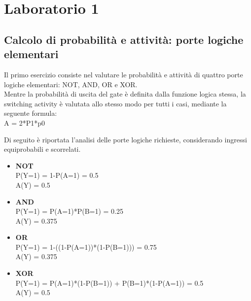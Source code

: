 

\chapter{Laboratorio 1}




\section{Calcolo di probabilit\`a e attivit\`a: porte logiche elementari}

Il primo esercizio consiste nel valutare le probabilit\`a e attività di quattro porte logiche elementari: NOT, AND, OR e XOR.
\\
Mentre la probabilità di uscita del gate è definita dalla funzione logica stessa, la switching activity è valutata allo stesso modo per tutti i casi, mediante la seguente formula: \\
A = 2*P1*p0

Di seguito è riportata l'analisi delle porte logiche richieste, considerando ingressi equiprobabili e scorrelati.

\begin{itemize}
\item \textbf{NOT} \\
P(Y=1) = 1-P(A=1) = 0.5 \\
A(Y) = 0.5
\item \textbf{AND} \\
P(Y=1) = P(A=1)*P(B=1) = 0.25 \\
A(Y) = 0.375
\item \textbf{OR} \\
P(Y=1) = 1-((1-P(A=1))*(1-P(B=1))) = 0.75 \\
A(Y) = 0.375
\item \textbf{XOR} \\
P(Y=1) = P(A=1)*(1-P(B=1)) + P(B=1)*(1-P(A=1)) = 0.5 \\
A(Y) = 0.5
\end{itemize} 

